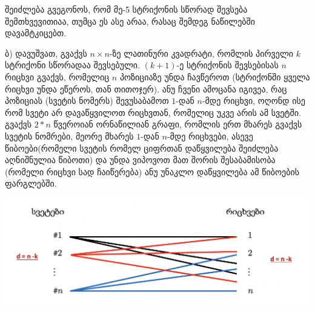 \documentclass[a4paper, 11pt]{article}
\begin{document}
\begin{sloppypar}
შეიძლება გვეგონოს, რომ მე-5 სტრიქონის სწორად შევსება შემთხვევითიაა, თუმცა ეს ასე არაა, რასაც შემდეგ ნაწილებში დავამტკიცებთ.

ბ) დავუშვათ, გვაქვს $n\times n$-ზე ლათინური კვადრატი, რომლის პირველი $k$ სტრიქონი სწორადაა შევსებული. $(k+1)$-ე სტრიქონის შევსებისას $n$ რიცხვი გვაქვს, რომელიც $n$ პოზიციაზე უნდა ჩავწეროთ (სტრიქონში ყველა რიცხვი უნდა ეწეროს, თან თითოჯერ). ანუ ჩვენი ამოცანა იგივეა, რაც პოზიციას (სვეტის ნომერს) შევუსაბამოთ $1$-დან $n$-მდე რიცხვი, ოღონდ ისე რომ სვეტი არ დავაწყვილოთ რიცხვთან, რომელიც უკვე არის ამ სვეტში. გვაქვს $2*n$ წვეროიან ორნაწილიან გრაფი, რომლის ერთ მხარეს გვაქვს სვეტის ნომრები, მეორე მხარეს $1$-დან $n$-მდე რიცხვები, ასევე წიბოები(რომელი სვეტის რომელ ციფრთან დაწყვილება შეიძლება აღნიშნულია წიბოთი) და უნდა ვიპოვოთ მათ შორის შესაბამისობა (რომელი რიცხვი სად ჩაიწერება) ანუ უნაკლო დაწყვილება ამ წიბოების ფარგლებში.

\includegraphics[scale = 0.7]{1.png}




\end{sloppypar}
\end{document}
